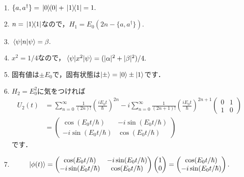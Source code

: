 \documentclass[a4paper,pdflatex,ja=standard]{bxjsarticle}
\begin{document}
\begin{enumerate}
  
  \item 

  $\{a,a^{\dagger}\}=\ketbra*{0}{0}+\ketbra*{1}{1}=1.$

  \item 

  $n=\ketbra*{1}{1}$なので，$H_1=E_0(2n-\{a,a^{\dagger}\}).$

  \item 

  $\mel{\psi}{n}{\psi}=\beta.$

  \item 

  $x^2=1/4$なので，$\mel{\psi}{x^2}{\psi}=(|\alpha|^2+|\beta|^2)/4.$

  \item 

  固有値は$\pm E_0$で，固有状態は$\ket{\pm}=\ket{0}\pm\ket{1}$です．

  \item 

  $H_2=E_0^2$に気をつければ
  \begin{align}
    U_2(t)
    &=
    \sum_{n=0}^{\infty}
    \frac{1}{(2n)!}\left( \frac{iE_0t}{\hbar} \right)^{2n}
    -i
    \sum_{n=0}^{\infty}
    \frac{1}{(2n+1)!}\left( \frac{iE_0t}{\hbar} \right)^{2n+1}
    \begin{pmatrix}
      0 & 1 \\
      1 & 0
    \end{pmatrix}
    \nonumber
    \\
    &=
    \begin{pmatrix}
      \cos(E_0 t/\hbar) & -i\sin(E_0 t/\hbar)\\
      -i\sin(E_0 t/\hbar) & \cos(E_0 t/\hbar)
    \end{pmatrix}
  \end{align}
  です．

  \item 

  \begin{equation}
    \ket{\phi(t)}
    =
    \begin{pmatrix}
      \cos(E_0 t/\hbar) & -i\sin(E_0 t/\hbar)\\
      -i\sin(E_0 t/\hbar) & \cos(E_0 t/\hbar)
    \end{pmatrix}
    \begin{pmatrix}
      1 \\
      0
    \end{pmatrix}
    =
    \begin{pmatrix}
      \cos(E_0 t/\hbar) \\
      -i\sin(E_0 t/\hbar)
    \end{pmatrix}
    .
  \end{equation}


\end{enumerate}
\end{document}
